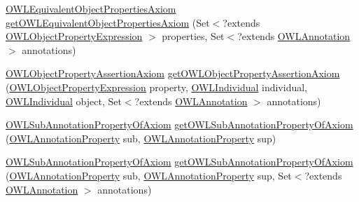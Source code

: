 \begin{DoxyCompactItemize}
\item 
\hyperlink{interfaceorg_1_1semanticweb_1_1owlapi_1_1model_1_1_o_w_l_equivalent_object_properties_axiom}{O\-W\-L\-Equivalent\-Object\-Properties\-Axiom} \hyperlink{classuk_1_1ac_1_1manchester_1_1cs_1_1owl_1_1owlapi_1_1_o_w_l_data_factory_impl_a45a2e771b925ed2f64eec7ba6b5445ab}{get\-O\-W\-L\-Equivalent\-Object\-Properties\-Axiom} (Set$<$?extends \hyperlink{interfaceorg_1_1semanticweb_1_1owlapi_1_1model_1_1_o_w_l_object_property_expression}{O\-W\-L\-Object\-Property\-Expression} $>$ properties, Set$<$?extends \hyperlink{interfaceorg_1_1semanticweb_1_1owlapi_1_1model_1_1_o_w_l_annotation}{O\-W\-L\-Annotation} $>$ annotations)
\item 
\hyperlink{interfaceorg_1_1semanticweb_1_1owlapi_1_1model_1_1_o_w_l_object_property_assertion_axiom}{O\-W\-L\-Object\-Property\-Assertion\-Axiom} \hyperlink{classuk_1_1ac_1_1manchester_1_1cs_1_1owl_1_1owlapi_1_1_o_w_l_data_factory_impl_aab67d90380ca13bb617bcb024b70cc06}{get\-O\-W\-L\-Object\-Property\-Assertion\-Axiom} (\hyperlink{interfaceorg_1_1semanticweb_1_1owlapi_1_1model_1_1_o_w_l_object_property_expression}{O\-W\-L\-Object\-Property\-Expression} property, \hyperlink{interfaceorg_1_1semanticweb_1_1owlapi_1_1model_1_1_o_w_l_individual}{O\-W\-L\-Individual} individual, \hyperlink{interfaceorg_1_1semanticweb_1_1owlapi_1_1model_1_1_o_w_l_individual}{O\-W\-L\-Individual} object, Set$<$?extends \hyperlink{interfaceorg_1_1semanticweb_1_1owlapi_1_1model_1_1_o_w_l_annotation}{O\-W\-L\-Annotation} $>$ annotations)
\item 
\hyperlink{interfaceorg_1_1semanticweb_1_1owlapi_1_1model_1_1_o_w_l_sub_annotation_property_of_axiom}{O\-W\-L\-Sub\-Annotation\-Property\-Of\-Axiom} \hyperlink{classuk_1_1ac_1_1manchester_1_1cs_1_1owl_1_1owlapi_1_1_o_w_l_data_factory_impl_a25c9dc80fdef48f532b12f68eb3babfd}{get\-O\-W\-L\-Sub\-Annotation\-Property\-Of\-Axiom} (\hyperlink{interfaceorg_1_1semanticweb_1_1owlapi_1_1model_1_1_o_w_l_annotation_property}{O\-W\-L\-Annotation\-Property} sub, \hyperlink{interfaceorg_1_1semanticweb_1_1owlapi_1_1model_1_1_o_w_l_annotation_property}{O\-W\-L\-Annotation\-Property} sup)
\item 
\hyperlink{interfaceorg_1_1semanticweb_1_1owlapi_1_1model_1_1_o_w_l_sub_annotation_property_of_axiom}{O\-W\-L\-Sub\-Annotation\-Property\-Of\-Axiom} \hyperlink{classuk_1_1ac_1_1manchester_1_1cs_1_1owl_1_1owlapi_1_1_o_w_l_data_factory_impl_a0cadc408cad9e2ed29d9069db0515219}{get\-O\-W\-L\-Sub\-Annotation\-Property\-Of\-Axiom} (\hyperlink{interfaceorg_1_1semanticweb_1_1owlapi_1_1model_1_1_o_w_l_annotation_property}{O\-W\-L\-Annotation\-Property} sub, \hyperlink{interfaceorg_1_1semanticweb_1_1owlapi_1_1model_1_1_o_w_l_annotation_property}{O\-W\-L\-Annotation\-Property} sup, Set$<$?extends \hyperlink{interfaceorg_1_1semanticweb_1_1owlapi_1_1model_1_1_o_w_l_annotation}{O\-W\-L\-Annotation} $>$ annotations)

\end{DoxyCompactItemize}
